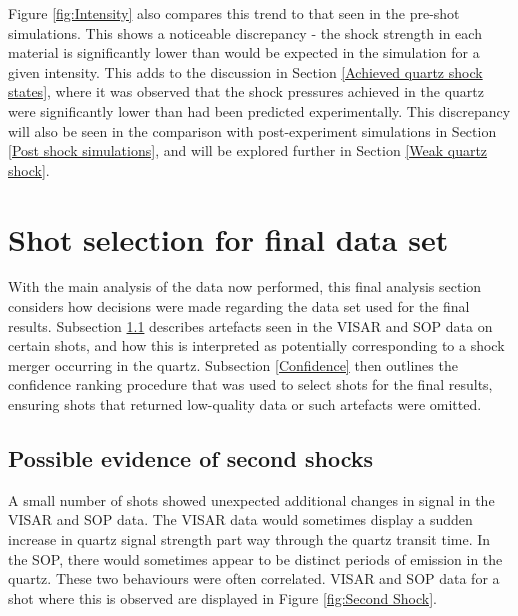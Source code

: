 Figure \ref{fig:Intensity} also compares this trend to that seen in the pre-shot simulations. This shows a noticeable discrepancy - the shock strength in each material is significantly lower than would be expected in the simulation for a given intensity. This adds to the discussion in Section \ref{Achieved quartz shock states}, where it was observed that the shock pressures achieved in the quartz were significantly lower than had been predicted experimentally. This discrepancy will also be seen in the comparison with post-experiment simulations in Section \ref{Post shock simulations}, and will be explored further in Section \ref{Weak quartz shock}.






\section{Shot selection for final data set} \label{Data choices}

With the main analysis of the data now performed, this final analysis section considers how decisions were made regarding the data set used for the final results. Subsection \ref{Second shock} describes artefacts seen in the VISAR and SOP data on certain shots, and how this is interpreted as potentially corresponding to a shock merger occurring in the quartz. Subsection \ref{Confidence} then outlines the confidence ranking procedure that was used to select shots for the final results, ensuring shots that returned low-quality data or such artefacts were omitted. 

\subsection{Possible evidence of second shocks}\label{Second shock}

A small number of shots showed unexpected additional changes in signal in the VISAR and SOP data. The VISAR data would sometimes display a sudden increase in quartz signal strength part way through the quartz transit time. In the SOP, there would sometimes appear to be distinct periods of emission in the quartz. These two behaviours were often correlated. VISAR and SOP data for a shot where this is observed are displayed in Figure \ref{fig:Second Shock}.

